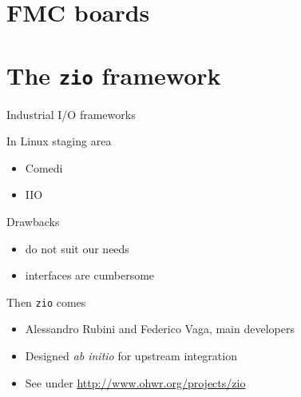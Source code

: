 \documentclass[compress,red]{beamer}
\begin{document}
\section{FMC boards}


\section{The \texttt{zio} framework}

\begin{frame}{Industrial I/O frameworks}

\pause
\begin{block}{In Linux staging area}
\begin{itemize}
\item Comedi
\item IIO
\end{itemize}
\end{block}

\pause
\begin{block}{Drawbacks}
\begin{itemize}
\item do not suit our needs
\item interfaces are cumbersome
\end{itemize}
\end{block}

\pause
\begin{block}{Then \texttt{zio} comes}
\begin{itemize}
\item Alessandro Rubini and Federico Vaga, main developers
\item Designed \emph{ab initio} for upstream integration
\item See under \url{http://www.ohwr.org/projects/zio}
\end{itemize}
\end{block}

\end{frame}

\end{document}
